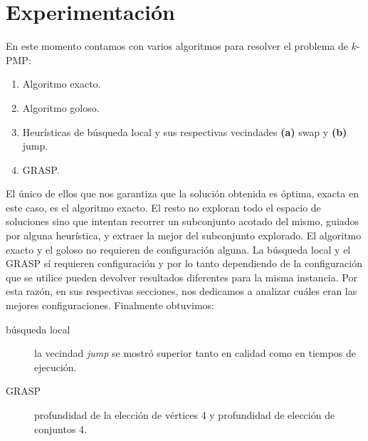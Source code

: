 \section{Experimentación} 

\noindent En este momento contamos con varios algoritmos para resolver el problema de $k$-PMP:
\begin{enumerate}
  \item Algoritmo exacto.
  \item Algoritmo goloso.
  \item Heurísticas de búsqueda local y sus respectivas vecindades \textbf{(a)} swap y \textbf{(b)} jump.
  \item GRASP.
\end{enumerate}

El único de ellos que nos garantiza que la solución obtenida es óptima, exacta en este caso, es el algoritmo exacto.
El resto no exploran todo el espacio de soluciones sino que intentan recorrer un subconjunto acotado del mismo,
guiados por alguna heurística, y extraer la mejor del subconjunto explorado. El algoritmo exacto y el goloso
no requieren de configuración alguna. La búsqueda local y el GRASP sí requieren configuración y por lo tanto
dependiendo de la configuración que se utilice pueden devolver resultados diferentes para la misma instancia.
Por esta razón, en sus respectivas secciones, nos dedicamos a analizar cuáles eran las mejores configuraciones.
Finalmente obtuvimos:

\begin{description}
  \item[búsqueda local] la vecindad \textit{jump} se mostró superior tanto en calidad como en tiempos de ejecución.
  \item[GRASP] profundidad de la elección de vértices 4 y profundidad de elección de conjuntos 4. 
\end{description}

